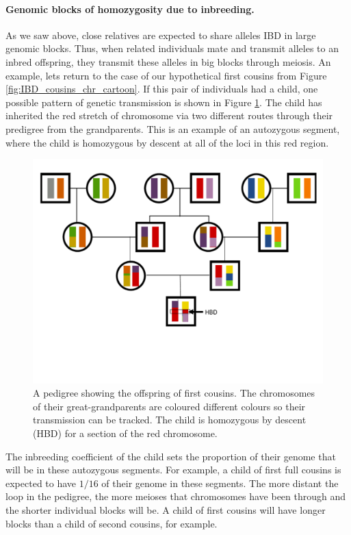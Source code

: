 {{%



  \paragraph{Genomic blocks of homozygosity due to inbreeding.}

As we saw above, close relatives are expected to share alleles IBD in
large genomic blocks. Thus, when related individuals mate and transmit
alleles to an inbred offspring, they transmit these alleles in big
blocks through meiosis. An example, lets return to the case of our
hypothetical first cousins from Figure
\ref{fig:IBD_cousins_chr_cartoon}. If this pair of individuals had a
child, one possible pattern of genetic transmission is shown in Figure
\ref{fig:kid_first_cousins}. The child has inherited the red stretch
of chromosome via two different routes through their predigree from
the grandparents. This is an example of an autozygous
segment, where the child is homozygous by descent at all of the loci in this
red region.
  \begin{figure}
  \begin{center}
    \includegraphics[width= 0.75 \textwidth]{figures/sharing_relatives/first_cousin_offspring.pdf}
\end{center}
\caption{A pedigree showing the offspring of first cousins. The
  chromosomes of their great-grandparents are coloured different colours
so their transmission can be tracked. The child is homozygous by
descent (HBD) for a section of the red chromosome.} \label{fig:kid_first_cousins}
\end{figure}
The inbreeding coefficient of the child sets the proportion of their
genome that will be in these autozygous segments. For example, a child
of first full cousins is expected to have $1/16$ of their
genome in these segments.
The more distant the loop in the pedigree, the more meioses that
chromosomes have been through and the shorter individual blocks will be. A
child of first cousins will have longer blocks than a child of second
cousins, for example.

}}
